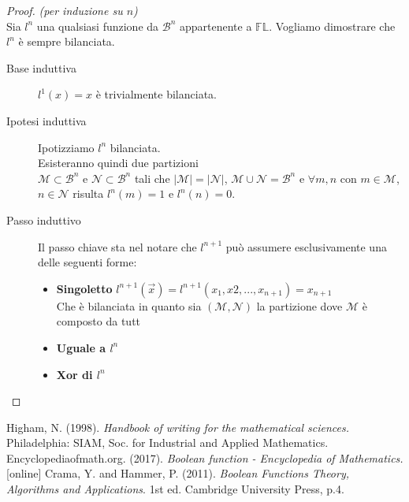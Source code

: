 \documentclass[12pt,a4paper,openright]{report}
\begin{document}
\begin{proof} \textit{(per induzione su $n$)\\}
    Sia $l^n$ una qualsiasi funzione da $\mathcal{B}^n$ appartenente a $\mathbb{FL}$.  Vogliamo dimostrare che $l^n$ è sempre bilanciata.\\
    \begin{description}
        \item[Base induttiva] $l^1(x)=x$ è trivialmente bilanciata.
        \item[Ipotesi induttiva] Ipotizziamo $l^n$ bilanciata.\\
                                      Esisteranno quindi due partizioni \\ $\mathcal{M}\subset\mathcal{B}^n$ e $\mathcal{N}\subset\mathcal{B}^n$ tali che
                                      ${\left\vert{\mathcal{M}}\right\vert} = {\left\vert{\mathcal{N}}\right\vert}$, $\mathcal{M} \cup \mathcal{N} = \mathcal{B}^n$ e $\forall m,n$ con
                                      $m\in\mathcal{M}$,$n \in\mathcal{N}$ risulta $l^n(m) = 1$ e $ l^n(n) = 0$.
        \item[Passo induttivo] Il passo chiave sta nel notare che $l^{n+1}$ può assumere esclusivamente una delle seguenti forme:
                                \begin{itemize}
                                    \item \textbf{Singoletto} $l^{n+1}(\vec{x}) = l^{n+1}(x_1,x2,...,x_{n+1})=x_{n+1}$\\
                                                              Che è bilanciata in quanto sia $(\mathcal{M},\mathcal{N})$ la partizione dove $\mathcal{M}$ è composto da tutt
                                    \item \textbf{Uguale a $l^n$}
                                    \item \textbf{Xor di $l^n$}
                                \end{itemize}
    \end{description}
\end{proof}

\begin{thebibliography}{20}
     Higham, N. (1998). \emph{Handbook of writing for the mathematical sciences.} Philadelphia: SIAM, Soc. for Industrial and Applied Mathematics.
     Encyclopediaofmath.org. (2017). \emph{Boolean function - Encyclopedia of Mathematics.} [online] 
     Crama, Y. and Hammer, P. (2011). \emph{Boolean Functions Theory, Algorithms and Applications}. 1st ed. Cambridge University Press, p.4.
\end{thebibliography}
\end{document}
